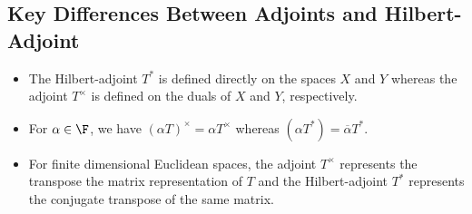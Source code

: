 \subsection{Key Differences Between Adjoints and Hilbert-Adjoint}

\begin{itemize}
    \item The Hilbert-adjoint \( T^{*} \) is defined directly on the spaces \( X  \) and \( Y  \) whereas the adjoint \( T^{\times} \) is defined on the duals of \( X  \) and \( Y \), respectively.
    \item For \( \alpha \in \F  \), we have \( (\alpha T)^{\times} = \alpha T^{\times} \) whereas \( (\alpha T^{*}) = \overline{\alpha} T^{*} \).
    \item For finite dimensional Euclidean spaces, the adjoint \( T^{\times} \) represents the transpose the matrix representation of \( T  \) and the Hilbert-adjoint \( T^{*} \) represents the conjugate transpose of the same matrix. 
\end{itemize}

